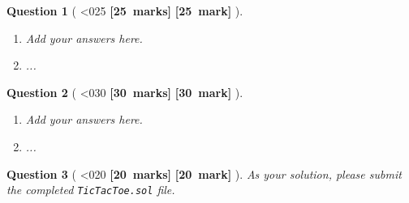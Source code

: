 \documentclass[a4paper]{article}
\theoremstyle{que}
\newtheorem{question}{Question}
\newcommand{\fixoffset}{\mbox{}\vspace*{-\bigskipamount}\vspace*{-\medskipamount}}
\newcommand\points[1]{%
\ifnum1<0#1\relax%
    {\bf \small [#1~marks]}%
  \else%
    {\bf \small [#1~mark]}%
  \fi%
}%
\begin{document}
\begin{question}[\points{25}]
  \fixoffset
  \begin{enumerate}[label=(\alph*)]
    \item Add your answers here.
    \item ...
  \end{enumerate}
\end{question}

\newpage


\begin{question}[\points{30}]
  \fixoffset
  \begin{enumerate}[label=(\alph*)]
    \item Add your answers here.
    \item ...
  \end{enumerate}
\end{question}

\newpage


\begin{question}[\points{20}]
  As your solution, please submit the completed {\tt TicTacToe.sol} file.
\end{question}

\newpage
\end{document}

